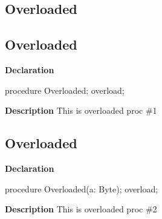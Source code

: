 \documentclass{report}
\newif\ifpdf
\begin{document}
\subsection*{\large{\textbf{Overloaded}}\normalsize\hspace{1ex}\hrulefill}
\else
\subsection*{Overloaded}
\fi
\label{ok_parse_impl-Overloaded}
\begin{list}{}{
\setlength{\itemindent}{0cm}
\setlength{\listparindent}{0cm}
\setlength{\leftmargin}{\evensidemargin}
\addtolength{\leftmargin}{\tmplength}
\settowidth{\labelsep}{X}
\addtolength{\leftmargin}{\labelsep}
\setlength{\labelwidth}{\tmplength}
}
\item[\textbf{Declaration}\hfill]
\ifpdf
\begin{flushleft}
\fi
\begin{ttfamily}
procedure Overloaded; overload;\end{ttfamily}

\ifpdf
\end{flushleft}
\fi

\par
\item[\textbf{Description}]
This is overloaded proc {\#}1

\end{list}
\ifpdf
\subsection*{\large{\textbf{Overloaded}}\normalsize\hspace{1ex}\hrulefill}
\else
\subsection*{Overloaded}
\fi
\label{ok_parse_impl-Overloaded}
\begin{list}{}{
\setlength{\itemindent}{0cm}
\setlength{\listparindent}{0cm}
\setlength{\leftmargin}{\evensidemargin}
\addtolength{\leftmargin}{\tmplength}
\settowidth{\labelsep}{X}
\addtolength{\leftmargin}{\labelsep}
\setlength{\labelwidth}{\tmplength}
}
\item[\textbf{Declaration}\hfill]
\ifpdf
\begin{flushleft}
\fi
\begin{ttfamily}
procedure Overloaded(a: Byte); overload;\end{ttfamily}

\ifpdf
\end{flushleft}
\fi

\par
\item[\textbf{Description}]
This is overloaded proc {\#}2

\end{list}
\ifpdf
\end{document}
